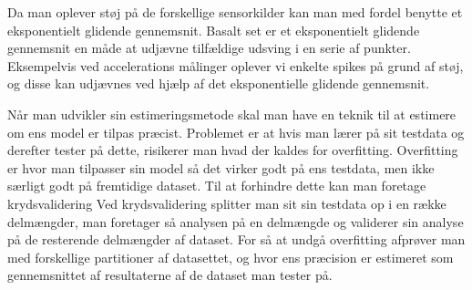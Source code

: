 \begin{description}[style=nextline]
\item[Eksponentielt glidende gennemsnit]
Da man oplever støj på de forskellige sensorkilder kan man med fordel benytte et eksponentielt glidende gennemsnit.
Basalt set er et eksponentielt glidende gennemsnit en måde at udjævne tilfældige udsving i en serie af punkter.
Eksempelvis ved accelerations målinger oplever vi enkelte spikes på grund af støj, og disse kan udjævnes ved hjælp af det eksponentielle glidende gennemsnit.

\item[Krydsvalidering]
Når man udvikler sin estimeringsmetode skal man have en teknik til at estimere om ens model er tilpas præcist.
Problemet er at hvis man lærer på sit testdata og derefter tester på dette, risikerer man hvad der kaldes for overfitting.
Overfitting er hvor man tilpasser sin model så det virker godt på ens testdata, men ikke særligt godt på fremtidige dataset.
Til at forhindre dette kan man foretage krydsvalidering
Ved krydsvalidering splitter man sit sin testdata op i en række delmængder, man foretager så analysen på en delmængde og validerer sin analyse på de resterende delmængder af dataset.
For så at undgå overfitting afprøver man med forskellige partitioner af datasettet, og hvor ens præcision er estimeret som gennemsnittet af resultaterne af de dataset man tester på.

\end{description}